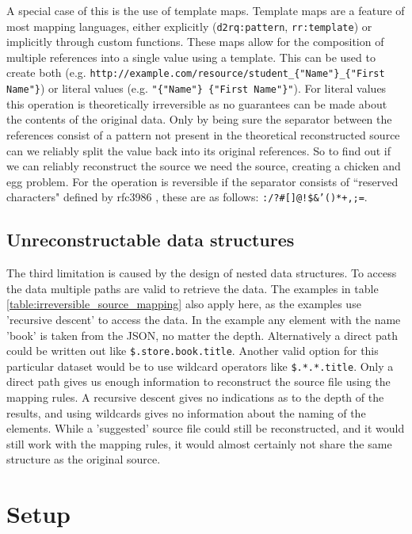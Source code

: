 A special case of this is the use of template maps. Template maps are a feature of most mapping languages, either explicitly (\texttt{d2rq:pattern}, \texttt{rr:template}) or implicitly through custom functions. These maps allow for the composition of multiple references into a single value using a template. This can be used to create both  (e.g. \texttt{http://example.com/resource/student\_\{"Name"\}\_\{"First Name"\}}) or literal values (e.g. \texttt{"\{"Name"\} \{"First Name"\}"}). For literal values this operation is theoretically irreversible as no guarantees can be made about the contents of the original data. Only by being sure the separator between the references consist of a pattern not present in the theoretical reconstructed source can we reliably split the value back into its original references. So to find out if we can reliably reconstruct the source we need the source, creating a chicken and egg problem. For  the operation is reversible if the separator consists of ``reserved characters" defined by rfc3986 \citep{rfc3986}, these are as follows: \texttt{:/?\#[]@!\$\&'()*+,;=}.

\subsection{Unreconstructable data structures}
The third limitation is caused by the design of nested data structures. To access the data multiple paths are valid to retrieve the data. The examples in table \ref{table:irreversible_source_mapping} also apply here, as the examples use 'recursive descent' to access the data. In the example any element with the name 'book' is taken from the JSON, no matter the depth. Alternatively a direct path could be written out like \texttt{\$.store.book.title}. Another valid option for this particular dataset would be to use wildcard operators like \texttt{\$.*.*.title}. Only a direct path gives us enough information to reconstruct the source file using the mapping rules. A recursive descent gives no indications as to the depth of the results, and using wildcards gives no information about the naming of the elements. While a 'suggested' source file could still be reconstructed, and it would still work with the mapping rules, it would almost certainly not share the same structure as the original source.

\section{Setup}

